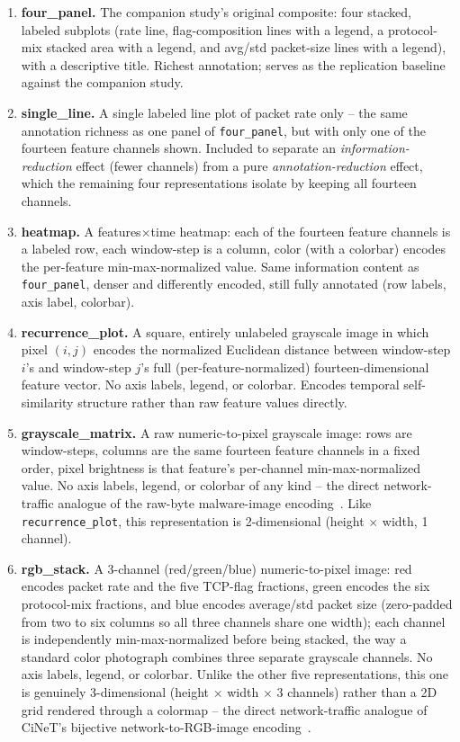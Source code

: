 \documentclass[twocolumn]{svjour3}
\begin{document}
\begin{enumerate}
\item \textbf{four\_panel.} The companion study's original composite: four stacked, labeled
subplots (rate line, flag-composition lines with a legend, a protocol-mix stacked area with a
legend, and avg/std packet-size lines with a legend), with a descriptive title. Richest annotation;
serves as the replication baseline against the companion study.
\item \textbf{single\_line.} A single labeled line plot of packet rate only -- the same annotation
richness as one panel of \texttt{four\_panel}, but with only one of the fourteen feature channels
shown. Included to separate an \emph{information-reduction} effect (fewer channels) from a pure
\emph{annotation-reduction} effect, which the remaining four representations isolate by keeping all
fourteen channels.
\item \textbf{heatmap.} A features$\times$time heatmap: each of the fourteen feature channels is a
labeled row, each window-step is a column, color (with a colorbar) encodes the per-feature
min-max-normalized value. Same information content as \texttt{four\_panel}, denser and differently
encoded, still fully annotated (row labels, axis label, colorbar).
\item \textbf{recurrence\_plot.} A square, entirely unlabeled grayscale image in which pixel
$(i,j)$ encodes the normalized Euclidean distance between window-step $i$'s and window-step $j$'s
full (per-feature-normalized) fourteen-dimensional feature vector. No axis labels, legend, or
colorbar. Encodes temporal self-similarity structure rather than raw feature values directly.
\item \textbf{grayscale\_matrix.} A raw numeric-to-pixel grayscale image: rows are window-steps,
columns are the same fourteen feature channels in a fixed order, pixel brightness is that feature's
per-channel min-max-normalized value. No axis labels, legend, or colorbar of any kind -- the direct
network-traffic analogue of the raw-byte malware-image encoding~\cite{nataraj2011malware}. Like
\texttt{recurrence\_plot}, this representation is 2-dimensional (height $\times$ width, 1 channel).
\item \textbf{rgb\_stack.} A 3-channel (red/green/blue) numeric-to-pixel image: red encodes packet
rate and the five TCP-flag fractions, green encodes the six protocol-mix fractions, and blue
encodes average/std packet size (zero-padded from two to six columns so all three channels share
one width); each channel is independently min-max-normalized before being stacked, the way a
standard color photograph combines three separate grayscale channels. No axis labels, legend, or
colorbar. Unlike the other five representations, this one is genuinely 3-dimensional (height
$\times$ width $\times$ 3 channels) rather than a 2D grid rendered through a colormap -- the direct
network-traffic analogue of CiNeT's bijective network-to-RGB-image encoding~\cite{bijective2025}.
\end{enumerate}
\end{document}
